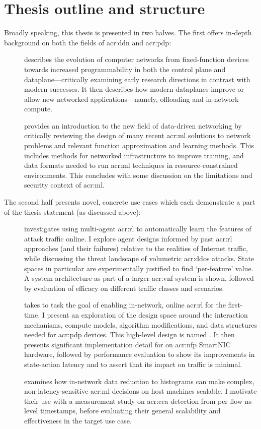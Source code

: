 \section{Thesis outline and structure}
Broadly speaking, this thesis is presented in two halves.
The first offers in-depth background on both the fields of \gls{acr:ddn} and \gls{acr:pdp}:
\begin{description}
	\item[] describes the evolution of computer networks from fixed-function devices towards increased programmability in both the control plane and dataplane---critically examining early research directions in contrast with modern successes. It then describes how modern dataplanes improve or allow new networked applications---namely, offloading and in-network compute.
	\item[] provides an introduction to the new field of data-driven networking by critically reviewing the design of many recent \gls{acr:ml} solutions to network problems and relevant function approximation and learning methods. This includes methods for networked infrastructure to improve training, and data formats needed to run \gls{acr:ml} techniques in resource-constrained environments. This concludes with some discussion on the limitations and security context of \gls{acr:ml}.
\end{description}
The second half presents novel, concrete use cases which each demonstrate a part of the thesis statement (as discussed above):
\begin{description}
	\item[] investigates using multi-agent \gls{acr:rl} to automatically learn the features of attack traffic online. I explore agent designs informed by past \gls{acr:rl} approaches (and their failures) relative to the realities of Internet traffic, while discussing the threat landscape of volumetric \gls{acr:ddos} attacks. State spaces in particular are experimentally justified to find `per-feature' value. A system architecture as part of a larger \gls{acr:vnf} system is shown, followed by evaluation of efficacy on different traffic classes and scenarios.
	\item[] takes to task the goal of enabling in-network, online \gls{acr:rl} for the first-time. I present an exploration of the design space around the interaction mechanisms, compute models, algorithm modifications, and data structures needed for \gls{acr:pdp} devices. This high-level design is named \approachshort{}. It then presents significant implementation detail for \approachshort{} on \gls{acr:nfp} SmartNIC hardware, followed by performance evaluation to show its improvements in state-action latency and to assert that its impact on traffic is minimal.
	\item[] examines how in-network data reduction to histograms can make complex, non-latency-sensitive \gls{acr:ml} decisions on host machines scalable. I motivate their use with a measurement study on \gls{acr:cca} detection from per-flow \unit{\nano\second}-level timestamps, before evaluating their general scalability and effectiveness in the target use case.
\end{description}
